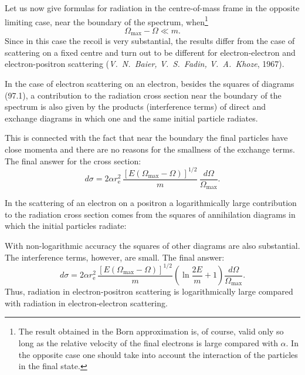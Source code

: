 Let us now give formulas for radiation in the centre-of-mass frame in the opposite limiting case, near the boundary of the spectrum, when\footnote{The result obtained in the Born approximation is, of course, valid only so long as the relative velocity of the final electrons is large compared with $\alpha$. In the opposite case one should take into account the interaction of the particles in the final state.}
\begin{equation}
\Omega_\text{max} - \Omega \ll m.
\label{eq:97.16}
\end{equation}
Since in this case the recoil is very substantial, the results differ from the case of scattering on a fixed centre and turn out to be different for electron-electron and electron-positron scattering (\emph{V.~N.~Baier, V.~S.~Fadin, V.~A.~Khoze}, 1967).

In the case of electron scattering on an electron, besides the squares of diagrams (97.1), a contribution to the radiation cross section near the boundary of the spectrum is also given by the products (interference terms) of direct and exchange diagrams in which one and the same initial particle radiates.


This is connected with the fact that near the boundary the final particles have close momenta and there are no reasons for the smallness of the exchange terms. The final answer for the cross section:
\begin{equation}
d\sigma = 2\alpha r_\mathrm{e}^2\,\frac{[E(\Omega_\text{max} - \Omega)]^{1/2}}{m}\,\frac{d\Omega}{\Omega_\text{max}}.
\label{eq:97.17}
\end{equation}

In the scattering of an electron on a positron a logarithmically large contribution to the radiation cross section comes from the squares of annihilation diagrams in which the initial particles radiate:



With non-logarithmic accuracy the squares of other diagrams are also substantial. The interference terms, however, are small. The final answer:
\begin{equation}
d\sigma = 2\alpha r_\mathrm{e}^2\,\frac{[E(\Omega_\text{max} - \Omega)]^{1/2}}{m}\!\left(\ln\frac{2E}{m} + 1\right)\frac{d\Omega}{\Omega_\text{max}}.
\label{eq:97.19}
\end{equation}
Thus, radiation in electron-positron scattering is logarithmically large compared with radiation in electron-electron scattering.
